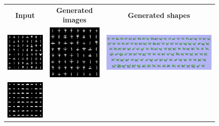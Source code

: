 \begin{figure}[h!]
  \newcommand{\fh}{0.18\linewidth}
  \begin{center}
  \setlength{\tabcolsep}{3pt}
  \begin{tabular}{ccc}
    \textbf{Input} & \textbf{Generated images} & \textbf{Generated shapes} \\
    \includegraphics[height=\fh]{prgan/fig/airplane/samples.png} & 
    \includegraphics[height=\fh]{prgan/fig/airplane/100.png} & 
    \includegraphics[height=\fh]{prgan/fig/airplane/output.png} \\
    \includegraphics[height=\fh]{prgan/fig/car/samples.png} & 

\end{tabular}
\end{center}
\end{figure}
